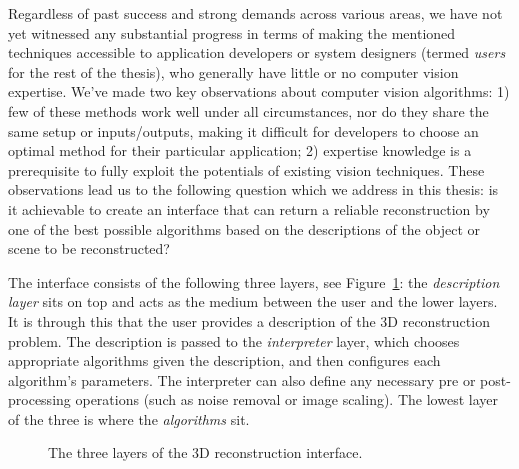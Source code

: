 Regardless of past success and strong demands across various areas, we have not yet witnessed any substantial progress in terms of making the mentioned techniques accessible to application developers or system designers (termed \textit{users} for the rest of the thesis), who generally have little or no computer vision expertise. We've made two key observations about computer vision algorithms: 1) few of these methods work well under all circumstances, nor do they share the same setup or inputs/outputs, making it difficult for developers to choose an optimal method for their particular application; 2) expertise knowledge is a prerequisite to fully exploit the potentials of existing vision techniques. These observations lead us to the following question which we address in this thesis: is it achievable to create an interface that can return a reliable reconstruction by one of the best possible algorithms based on the descriptions of the object or scene to be reconstructed?

The interface consists of the following three layers, see Figure~\ref{fig:interface_overview}: the \textit{description layer} sits on top and acts as the medium between the user and the lower layers. It is through this that the user provides a description of the 3D reconstruction problem. The description is passed to the \textit{interpreter} layer, which chooses appropriate algorithms given the description, and then configures each algorithm's parameters. The interpreter can also define any necessary pre or post-processing operations (such as noise removal or image scaling). The lowest layer of the three is where the \textit{algorithms} sit.
\begin{figure}[!htbp]
\centering
{}
\caption{The three layers of the 3D reconstruction interface.}
\label{fig:interface_overview}
\end{figure}


